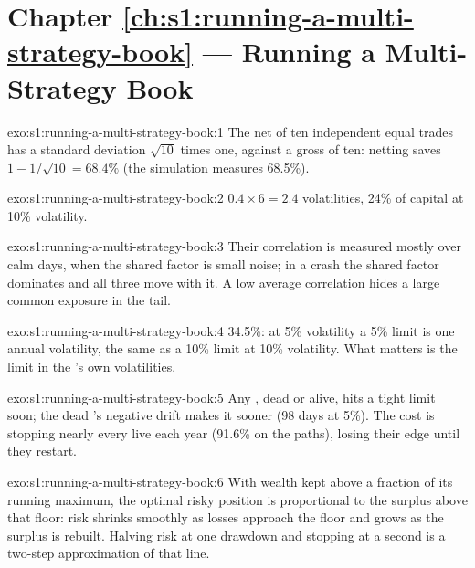 \section*{Chapter \ref{ch:s1:running-a-multi-strategy-book} --- Running a Multi-Strategy Book}

\begin{solution}{exo:s1:running-a-multi-strategy-book:1}
The net of ten independent equal trades has a standard deviation $\sqrt{10}$ times one, against a gross of ten: netting saves $1 - 1/\sqrt{10} = 68.4\%$
(the simulation measures 68.5\%).
\end{solution}

\begin{solution}{exo:s1:running-a-multi-strategy-book:2}
$0.4 \times 6 = 2.4$ volatilities, 24\% of capital at 10\% volatility.
\end{solution}

\begin{solution}{exo:s1:running-a-multi-strategy-book:3}
Their correlation is measured mostly over calm days, when the shared factor is small noise; in a crash the shared factor dominates and all three move
with it. A low average correlation hides a large common exposure in the tail.
\end{solution}

\begin{solution}{exo:s1:running-a-multi-strategy-book:4}
34.5\%: at 5\% volatility a 5\% limit is one annual volatility, the same as a 10\% limit at 10\% volatility. What matters is the limit in the 's own
volatilities.
\end{solution}

\begin{solution}{exo:s1:running-a-multi-strategy-book:5}
Any , dead or alive, hits a tight limit soon; the dead 's negative drift makes it sooner (98 days at 5\%). The cost is stopping nearly every live 
each year (91.6\% on the paths), losing their edge until they restart.
\end{solution}

\begin{solution}{exo:s1:running-a-multi-strategy-book:6}
With wealth kept above a fraction of its running maximum, the optimal risky position is proportional to the surplus above that floor: risk shrinks
smoothly as losses approach the floor and grows as the surplus is rebuilt. Halving risk at one drawdown and stopping at a second is a two-step
approximation of that line.
\end{solution}

